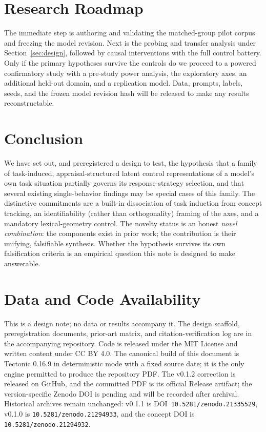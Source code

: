 \documentclass[11pt]{article}
\begin{document}
\section{Research Roadmap}
\label{sec:roadmap}

The immediate step is authoring and validating the matched-group pilot corpus and
freezing the model revision. Next is the probing and transfer analysis under
Section~\ref{sec:design}, followed by causal interventions with the full control
battery. Only if the primary hypotheses survive the controls do we proceed to a
powered confirmatory study with a pre-study power analysis, the exploratory axes, an
additional held-out domain, and a replication model. Data, prompts, labels, seeds,
and the frozen model revision hash will be released to make any results
reconstructable.

\section{Conclusion}
\label{sec:conclusion}

We have set out, and preregistered a design to test, the hypothesis that a family of
task-induced, appraisal-structured latent control representations of a model's own
task situation partially governs its response-strategy selection, and that several
existing single-behavior findings may be special cases of this family. The
distinctive commitments are a built-in dissociation of task induction from concept
tracking, an identifiability (rather than orthogonality) framing of the axes, and a
mandatory lexical-geometry control. The novelty status is an honest \emph{novel
combination}: the components exist in prior work; the contribution is their
unifying, falsifiable synthesis. Whether the hypothesis survives its own
falsification criteria is an empirical question this note is designed to make
answerable.

\section*{Data and Code Availability}
This is a design note; no data or results accompany it. The design scaffold,
preregistration documents, prior-art matrix, and citation-verification log are in
the accompanying repository. Code is released under the MIT License and written
content under CC BY 4.0. The canonical build of this document is Tectonic 0.16.9 in
deterministic mode with a fixed source date; it is the only engine permitted to
produce the repository PDF. The v0.1.2 correction is released on GitHub, and the
committed PDF is its official Release artifact; the version-specific Zenodo DOI is
pending and will be recorded after archival. Historical archives remain unchanged:
v0.1.1 is
DOI~\texttt{10.5281/zenodo.21335529}, v0.1.0 is
\texttt{10.5281/zenodo.21294933}, and the concept DOI is
\texttt{10.5281/zenodo.21294932}.



\end{document}
